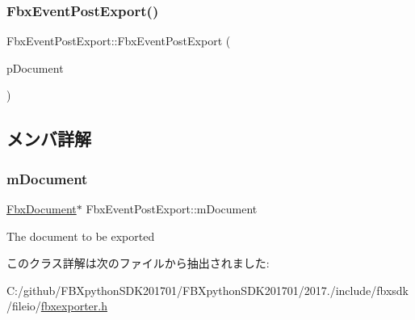 \subsubsection{\texorpdfstring{Fbx\+Event\+Post\+Export()}{FbxEventPostExport()}}
{\footnotesize\ttfamily Fbx\+Event\+Post\+Export\+::\+Fbx\+Event\+Post\+Export (\begin{DoxyParamCaption}\item[{\hyperlink{class_fbx_document}{Fbx\+Document} $\ast$}]{p\+Document }\end{DoxyParamCaption})}



\subsection{メンバ詳解}
\mbox{\label{class_fbx_event_post_export_aca668d4ffcd12dc1b6455bb5165fb2f5}} 
\subsubsection{\texorpdfstring{m\+Document}{mDocument}}
{\footnotesize\ttfamily \hyperlink{class_fbx_document}{Fbx\+Document}$\ast$ Fbx\+Event\+Post\+Export\+::m\+Document}



The document to be exported 



このクラス詳解は次のファイルから抽出されました\+:\begin{DoxyCompactItemize}
\item 
C\+:/github/\+F\+B\+Xpython\+S\+D\+K201701/\+F\+B\+Xpython\+S\+D\+K201701/2017./include/fbxsdk/fileio/\hyperlink{fbxexporter_8h}{fbxexporter.\+h}\end{DoxyCompactItemize}
